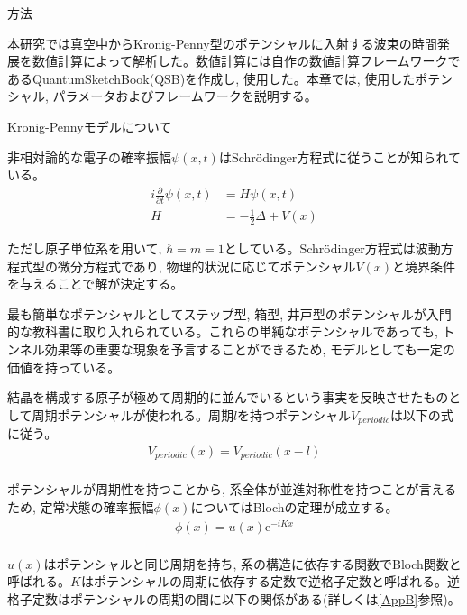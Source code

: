 \documentclass[a4paper, lualatex]{bxjsarticle}
\begin{document}
\newpage

\begin{section}{方法}
    \par 本研究では真空中からKronig-Penny型のポテンシャルに入射する波束の時間発展を数値計算によって解析した。数値計算には自作の数値計算フレームワークであるQuantumSketchBook(QSB)\cite{QSB}を作成し, 使用した。本章では, 使用したポテンシャル, パラメータおよびフレームワークを説明する。
    \begin{subsection}{Kronig-Pennyモデルについて}
        \par 非相対論的な電子の確率振幅$\psi(x, t)$はSchrödinger方程式に従うことが知られている\cite{Koide}。
        \begin{align}
         i \frac{\partial}{\partial t}\psi(x, t) &= H \psi(x, t)\nonumber\\
             H &= -\frac{1}{2}\Delta + V(x)
        \end{align}
        \par ただし原子単位系を用いて, $\hbar=m=1$としている。Schrödinger方程式は波動方程式型の微分方程式であり, 物理的状況に応じてポテンシャル$V(x)$と境界条件を与えることで解が決定する。
        \par 最も簡単なポテンシャルとしてステップ型, 箱型, 井戸型のポテンシャルが入門的な教科書\cite{Koide}に取り入れられている。これらの単純なポテンシャルであっても, トンネル効果等の重要な現象を予言することができるため, モデルとしても一定の価値を持っている。
        \par 結晶を構成する原子が極めて周期的に並んでいるという事実を反映させたものとして周期ポテンシャルが使われる。周期$l$を持つポテンシャル$V_{periodic}$は以下の式に従う。
        \begin{align}
         V_{periodic}(x)=V_{periodic}(x-l)\nonumber\\
        \end{align}
        \par ポテンシャルが周期性を持つことから, 系全体が並進対称性を持つことが言えるため, 定常状態の確率振幅$\phi(x)$についてはBlochの定理\cite{Bloch}が成立する。
            \begin{align}
             \phi(x)=u(x)\mathrm{e}^{-iKx}\nonumber\\
            \end{align}
        \par $u(x)$はポテンシャルと同じ周期を持ち, 系の構造に依存する関数でBloch関数と呼ばれる。$K$はポテンシャルの周期に依存する定数で逆格子定数と呼ばれる。逆格子定数はポテンシャルの周期の間に以下の関係がある(詳しくは\ref{AppB}参照)。

\end{subsection}
\end{section}
\end{document}
